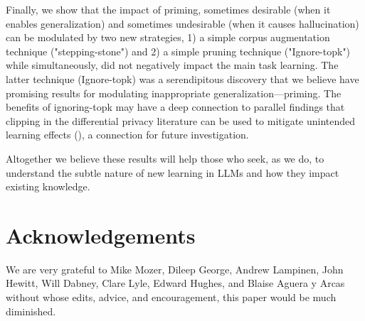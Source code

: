 \documentclass[11pt, a4paper, logo, copyright]{googledeepmind}
\theoremstyle{plain}
\theoremstyle{definition}
\theoremstyle{remark}
\begin{document}
Finally, we show that the impact of priming, sometimes desirable (when it  enables generalization) and sometimes undesirable (when it causes hallucination) can be modulated by two new strategies, 1) a simple corpus augmentation technique ("stepping-stone") and 2) a simple pruning technique ("Ignore-topk") while simultaneously, did not negatively impact the main task learning. The latter technique (Ignore-topk) was a serendipitous discovery that we believe have promising results for modulating inappropriate generalization---priming. The benefits of ignoring-topk may have a deep connection to parallel findings that clipping in the differential privacy literature can be used to mitigate unintended learning effects (\cite{diff_privacy}), a connection for future investigation.


Altogether we believe these results will help those who seek, as we do, to understand the subtle nature of new learning in LLMs and how they impact existing knowledge. 


 \section{Acknowledgements}

We are very grateful to Mike Mozer, Dileep George, Andrew Lampinen, John Hewitt, Will Dabney, Clare Lyle, Edward Hughes, and Blaise Aguera y Arcas without whose edits, advice, and encouragement, this paper would be much diminished. 







\end{document}
